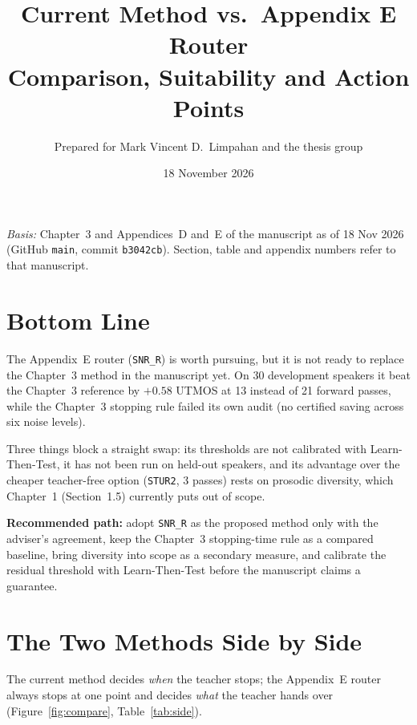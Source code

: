 \documentclass[11pt,a4paper]{article}
\title{\textbf{Current Method vs.\ Appendix E Router}\\[2pt]\large Comparison, Suitability and Action Points}
\author{Prepared for Mark Vincent D.\ Limpahan and the thesis group}
\date{18 November 2026}
\newcommand{\snrr}{\texttt{SNR\_R}}
\begin{document}
\maketitle

\noindent\textit{Basis:} Chapter~3 and Appendices~D and~E of the manuscript as of 18 Nov 2026 (GitHub \texttt{main}, commit \texttt{b3042cb}). Section, table and appendix numbers refer to that manuscript.

\section{Bottom Line}

The Appendix~E router (\snrr) is worth pursuing, but it is not ready to replace the Chapter~3 method in the manuscript yet. On 30 development speakers it beat the Chapter~3 reference by $+0.58$ UTMOS at 13 instead of 21 forward passes, while the Chapter~3 stopping rule failed its own audit (no certified saving across six noise levels).

Three things block a straight swap: its thresholds are not calibrated with Learn-Then-Test, it has not been run on held-out speakers, and its advantage over the cheaper teacher-free option (\texttt{STUR2}, 3 passes) rests on prosodic diversity, which Chapter~1 (Section~1.5) currently puts out of scope.

\textbf{Recommended path:} adopt \snrr{} as the proposed method only with the adviser's agreement, keep the Chapter~3 stopping-time rule as a compared baseline, bring diversity into scope as a secondary measure, and calibrate the residual threshold with Learn-Then-Test before the manuscript claims a guarantee.

\section{The Two Methods Side by Side}

The current method decides \emph{when} the teacher stops; the Appendix~E router always stops at one point and decides \emph{what} the teacher hands over (Figure~\ref{fig:compare}, Table~\ref{tab:side}).
\end{document}
